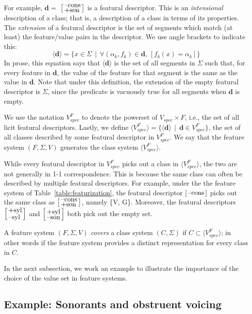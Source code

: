\documentclass[12pt, oneside]{article}   	%
\newcommand{\featmat}[1]
{$\begin{bsmallmatrix*}[l]\text{\normalsize #1}\end{bsmallmatrix*}$}
\newcommand{\featmattwo}[2]{$\begin{bsmallmatrix*}[l]\text{\normalsize #1}\\\text{\normalsize #2}\end{bsmallmatrix*}$}
\begin{document}
For example, $\mathbf{d} =$  \featmattwo{--cons}{+son} is a featural descriptor. This is an \textit{intensional} description of a class; that is, a description of a class in terms of its properties. The \textit{extension} of a featural descriptor is the set of segments which match (at least) the feature/value pairs in the descriptor. We use angle brackets to indicate this:
$$ \big \langle \mathbf{d} \big \rangle = \{x \in \Sigma \, \mid \, \forall (\alpha_k, f_k) \in \mathbf{d} \text{,  } [ f_k(x) = \alpha_k ] \} $$
In prose, this equation says that $\big \langle \mathbf{d} \big \rangle$ is the set of all segments in $\Sigma$ such that, for every feature in $\mathbf{d}$, the value of the feature for that segment is the same as the value in $\mathbf{d}$. Note that under this definition, the extension of the empty featural descriptor is $\Sigma$, since the predicate is vacuously true for all segments when $\mathbf{d}$ is empty. 

We use the notation $V_{spec}^F$ to denote the powerset of $V_{spec} \times F$, i.e., the set of all licit featural descriptors. Lastly, we define $\langle V_{spec}^F \rangle = \{ \langle \mathbf{d} \rangle \, \mid \, \mathbf{d} \in V_{spec}^F \}$, the set of all classes described by some featural descriptor in $V_{spec}^F$. We say that the feature system $(F, \Sigma, V)$ generates the class system $\langle V_{spec}^F \rangle$.

While every featural descriptor in $V_{spec}^F$ picks out a class in $\langle V_{spec}^F \rangle$, the two are not generally in 1-1 correspondence. This is because the same class can often be described by multiple featural descriptors. For example, under the the feature system of Table~\ref{table:featurization}, the featural descriptor \featmat{--cons} picks out the same class as \featmattwo{--cons}{+son}, namely \{V, G\}. Moreover, the featural descriptors \featmattwo{+syl}{--syl} and \featmattwo{+syl}{--son} both pick out the empty set.

A feature system $(F, \Sigma, V)$ \textit{covers} a class system $(C, \Sigma)$ if $C \subset \langle V_{spec}^F \rangle$; in other words if the feature system provides a distinct representation for every class in $C$. 

In the next subsection, we work an example to illustrate the importance of the choice of the value set in feature systems.

\subsection{Example: Sonorants and obstruent voicing}
\end{document}
